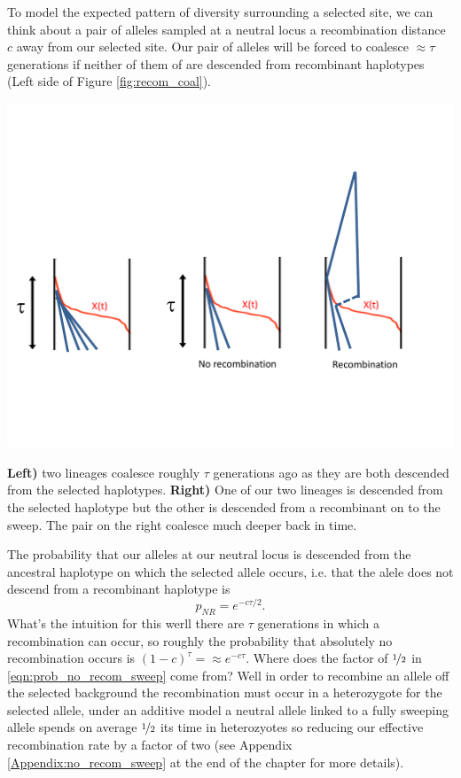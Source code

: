 To model the expected pattern of diversity surrounding a selected site, we can think about a pair
of alleles sampled at a neutral locus a recombination distance $c$
away from our selected site. Our pair of alleles will be forced to
coalesce $\approx \tau$ generations if neither of them of are
descended from recombinant haplotypes (Left side of Figure \ref{fig:recom_coal}).\\
\begin{marginfigure}
\begin{center}
\includegraphics[width= \textwidth]{figures/Hitchhiking/Recom_coal.pdf}
\end{center}
\caption{{\bf Left)} two lineages coalesce roughly $\tau$ generations
  ago as they are both descended from the selected haplotypes. {\bf Right)}
One of our two lineages is descended from the selected haplotype but
the other is descended from a recombinant on to the sweep. The pair on
the right coalesce much deeper back in time.} \label{fig:recom_coal}
\end{marginfigure}
The probability that our alleles at our neutral locus is descended
from the ancestral haplotype on which the selected allele occurs,
i.e. that the alele does not descend from a recombinant haplotype is
\begin{equation}
p_{NR} = e^{-c \tau/2 }. \label{eqn:prob_no_recom_sweep}
\end{equation}
What's the intuition for this werll there are $\tau$ generations in
which a recombination can occur, so roughly the probability that
absolutely no recombination occurs is $(1-c)^{\tau} =\approx
e^{-c\tau}$. Where does the factor of $\nicefrac{1}{2}$ in \eqn
\eqref{eqn:prob_no_recom_sweep} come from? Well in order to recombine an allele off the selected background the
recombination must occur in a heterozygote for the selected allele,
under an additive model a neutral allele linked to a fully sweeping allele
spends on average $\nicefrac{1}{2}$ its time in heterozyotes so
reducing our effective recombination rate by a factor of two (see
Appendix \ref{Appendix:no_recom_sweep} at the end of the chapter for
more details).\\

